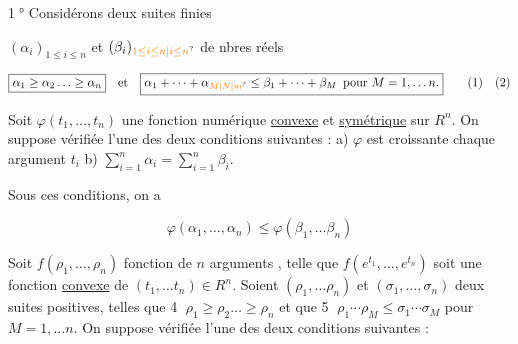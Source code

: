   \textcircled{1°}   Considérons deux suites finies

$(\alpha_i)_{1\leq i\leq n}$ et $(\beta_i)_{\unsure{1\leq i\leq n|i\leq n}}$ de nbres réels  

\[
\boxed{\alpha_1\geq\alpha_2\ldots\geq\alpha_n}\quad\text{et}\quad
\boxed{\alpha_1+\cdots+\alpha_{\unsure{M|N|m}}\leq\beta_1+\cdots+\beta_M\enspace\text{pour }M=1,\ldots n.}\tag*{(1)\quad(2)}
\]

Soit $\varphi(t_1,\ldots,t_n)$ une fonction numérique \uline{convexe} et \uline{symétrique} sur $R^n$. On suppose vérifiée l'une des deux conditions suivantes : a) $\varphi$ est croissante  chaque argument $t_i$  b) $\sum_{i=1}^n\alpha_i=\sum_{i=1}^{n}\beta_i$.


Sous ces conditions, on a

\[
\varphi(\alpha_1,\ldots,\alpha_n)\leq\varphi(\beta_1,\ldots\beta_n)\tag*{(3)}
\]


  Soit $f(\rho_1,\ldots,\rho_n)$ fonction   de $n$ arguments  , telle que $f(e^{t_1},\ldots,e^{t_n})$ soit une fonction \uline{convexe} de $(t_1,\ldots t_n)\in R^n$. Soient $(\rho_1,\ldots\rho_n)$ et $(\sigma_1,\ldots,\sigma_n)$ deux suites  positives, telles que  \textcircled{4} $\boxed{\rho_1\geq\rho_2\ldots\geq\rho_n}$ et que  \textcircled{5} $\boxed{\rho_1\cdots\rho_M\leq\sigma_1\cdots\sigma_M}$ pour  $M=1,\ldots n$. On suppose vérifiée l'une des deux conditions suivantes :


